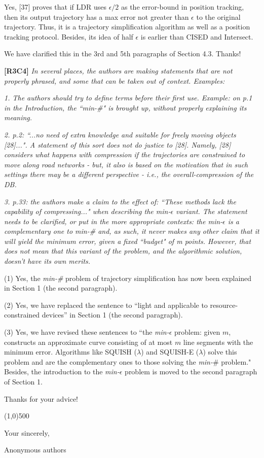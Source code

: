 \documentclass{letter}
\begin{document}
{Yes, [37] proves that if LDR uses $\epsilon/2$ as the error-bound in position tracking, then its output trajectory has a max error not greater than $\epsilon$ to the original trajectory. Thus, it is a trajectory simplification algorithm as well as a position tracking protocol.} Besides, its idea of half $\epsilon$ is earlier than CISED and Intersect.

We have clarified this in the 3rd and 5th paragraphs of Section 4.3. Thanks!

\textbf{[R3C4]} \emph{
In several places, the authors are making statements that are not properly phrased, and some that can be taken out of context. Examples:}

\emph{1. The authors should try to define terms before their first use. Example: on p.1 in the Introduction, the ``min-\#" is brought up, without properly explaining its meaning.}


\emph{2. p.2: ``...no need of extra knowledge and suitable for freely moving objects [28]...". A statement of this sort does not do justice to [28].
Namely, [28] considers what happens with compression if the trajectories are constrained to move along road networks - but, it also is based on the motivation that in such settings there may be a different perspective - i.e., the overall-compression of the DB.}


\emph{3. p.33: the authors make a claim to the effect of: ``These methods lack the capability of compressing..." when describing the min-$\epsilon$ variant. The statement needs to be clarified, or put in the more appropriate contexts: the min-$\epsilon$  is a complementary one to min-\# and, as such, it never makes any other claim that it will yield the minimum error, given a fixed ``budget" of m points. However, that does not mean that this variant of the problem, and the algorithmic solution, doesn't have its own merits.}



(1) Yes, the \emph{min-\#} problem of trajectory simplification has now been explained in Section 1 (the second paragraph).

(2) Yes, we have replaced the sentence to ``light and applicable to resource-constrained devices'' in Section 1 (the second paragraph).

(3) Yes, we have revised these sentences to ``the \emph{min-$\epsilon$} problem: given $m$, constructs an approximate curve consisting of at most $m$ line segments with the minimum error. Algorithms like SQUISH ($\lambda$) and SQUISH-E ($\lambda$) solve this problem and are the complementary ones to those solving the \emph{min-$\#$} problem." Besides, the introduction to the \emph{min-$\epsilon$} problem is moved to the second paragraph of Section 1.

Thanks for your advice!

\line(1,0){500}



Your sincerely,

Anonymous authors

%
%
\end{document}
